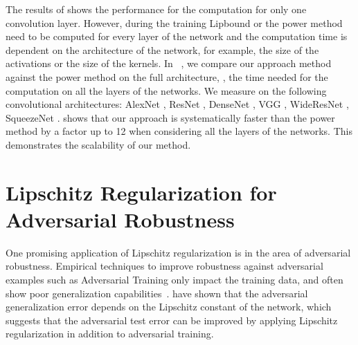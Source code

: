 The results of  shows the performance for the computation for only one convolution layer.
However, during the training Lipbound or the power method need to be computed for every layer of the network and the computation time is dependent on the architecture of the network, for example, the size of the activations or the size of the kernels.
In ~, we compare our approach method against the power method on the full architecture, \ie, the time needed for the computation on all the layers of the networks.
We measure on the following convolutional architectures: AlexNet \cite{krizhevsky2012imagenet}, ResNet \cite{he2016deep}, DenseNet \cite{huang2017densely}, VGG \cite{simonyan2014very}, WideResNet \cite{zagoruyko2016wide}, SqueezeNet \cite{iandola2016squeezenet}.
 shows that our approach is systematically faster than the power method by a factor up to 12 when considering all the layers of the networks.
This demonstrates the scalability of our method.









\section{Lipschitz Regularization for Adversarial Robustness}
\label{section:ch5-lipschitz_regularization_for_adversarial_robustness}



One promising application of Lipschitz regularization is in the area of adversarial robustness.
Empirical techniques to improve robustness against adversarial examples such as Adversarial Training only impact the training data,  and often show poor generalization capabilities~\cite{schmidt2018adversarially}.
\citet{farnia2018generalizable} have shown that the adversarial generalization error depends on the Lipschitz constant of the network, which suggests that the adversarial test error can be improved by applying Lipschitz regularization in addition to adversarial training.

